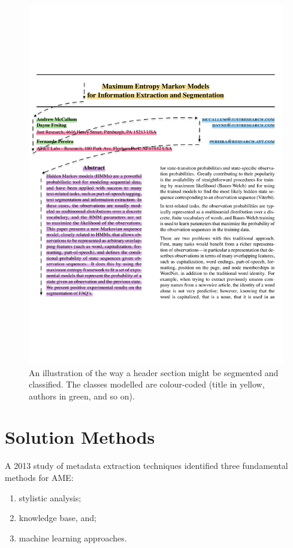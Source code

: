 \begin{figure}[!ht]
\center
\includegraphics[width=\textwidth]{Figures/extraction.pdf}
\caption{An illustration of the way a header section might be segmented and classified. The classes modelled are colour-coded (title in yellow, authors in green, and so on).}
\label{fig:grobid}
\end{figure}

\section{Solution Methods}
\label{sec:solutionmethods}
A 2013 study of metadata extraction techniques \cite{lipinski2013evaluation} identified three fundamental methods for AME:

\begin{enumerate}
\item stylistic analysis;
\item knowledge base, and;
\item machine learning approaches.
\end{enumerate}

